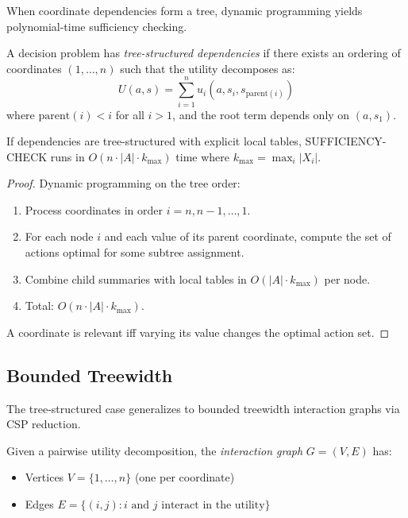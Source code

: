 When coordinate dependencies form a tree, dynamic programming yields polynomial-time sufficiency checking.

\begin{definition}\label{def:tree-struct}
A decision problem has \emph{tree-structured dependencies} if there exists an ordering of coordinates $(1, \ldots, n)$ such that the utility decomposes as:
\[
U(a, s) = \sum_{i=1}^n u_i(a, s_i, s_{\mathrm{parent}(i)})
\]
where $\mathrm{parent}(i) < i$ for all $i > 1$, and the root term depends only on $(a, s_1)$.
\end{definition}

\begin{theorem}\label{thm:tree-struct}
If dependencies are tree-structured with explicit local tables, SUFFICIENCY-CHECK runs in $O(n \cdot |A| \cdot k_{\max})$ time where $k_{\max} = \max_i |X_i|$.
\end{theorem}


\begin{proof}
Dynamic programming on the tree order:
\begin{enumerate}
\item Process coordinates in order $i = n, n-1, \ldots, 1$.
\item For each node $i$ and each value of its parent coordinate, compute the set of actions optimal for some subtree assignment.
\item Combine child summaries with local tables in $O(|A| \cdot k_{\max})$ per node.
\item Total: $O(n \cdot |A| \cdot k_{\max})$.
\end{enumerate}
A coordinate is relevant iff varying its value changes the optimal action set.
\end{proof}

\subsection{Bounded Treewidth}\label{sec:tract-treewidth}

The tree-structured case generalizes to bounded treewidth interaction graphs via CSP reduction.

\begin{definition}\label{def:interaction-graph}
Given a pairwise utility decomposition, the \emph{interaction graph} $G = (V, E)$ has:
\begin{itemize}
\item Vertices $V = \{1, \ldots, n\}$ (one per coordinate)
\item Edges $E = \{(i, j) : i \text{ and } j \text{ interact in the utility}\}$
\end{itemize}
\end{definition}


